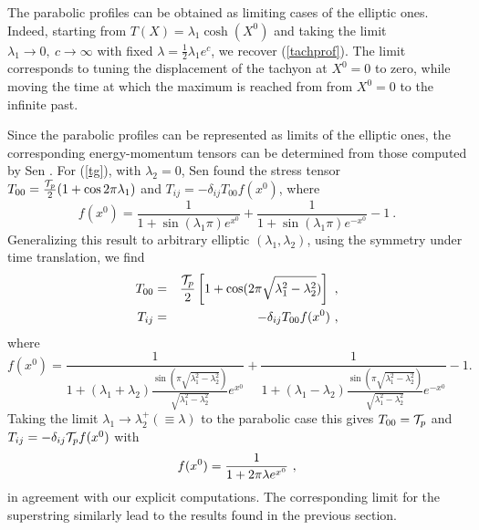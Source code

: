 \documentclass[a4paper,12pt]{article}
\begin{document}
The parabolic profiles can be obtained as limiting cases of the elliptic ones.
Indeed, starting from $T(X)= \lambda_1 \cosh (X^0)$ and taking the
limit  $\lambda_1 \rightarrow 0,~c \rightarrow \infty $ with fixed 
$\lambda = \frac{1}{2} \lambda_1 e^{c}$, we recover (\ref{tachprof}).
The limit corresponds to tuning the displacement of the tachyon at $X^0=0$ to 
zero, while moving the time at which the maximum is reached from 
from $X^0=0$ to the infinite past. 

Since the parabolic profiles can be represented as limits of the elliptic ones,
the corresponding energy-momentum tensors can be determined from those
computed by Sen \cite{Sen1}. For  (\ref{tg}), with $\lambda_2=0$, Sen found
the stress tensor 
$T_{00}={{\cal T}_p \over 2} (1+ \cos 2 \pi \lambda_1)$
and $T_{ij}=-\delta_{ij} T_{00} f(x^0)$,
where 
\begin{equation}
f(x^0)=\frac{1}{1+ \sin (\lambda_1 \pi) e^{x^0}} 
+\frac{1}{1+ \sin (\lambda_1 \pi) e^{-x^0}} -1~. 
\end{equation}
Generalizing this result to arbitrary elliptic $(\lambda_1,\lambda_2)$,
using the symmetry under time translation, we find
\begin{eqnarray}
T_{00}&=&{{\cal T}_p \over 2} \left[1+ \cos  (2 \pi \sqrt{\lambda_1^2-\lambda_2^2}) \right]~,\nonumber \\
 T_{ij}&=&-\delta_{ij} T_{00} f(x^0)~,
\end{eqnarray}
where 
\begin{equation}
f(x^0)=\frac{1}{1+ 
(\lambda_1+\lambda_2) 
\frac{\sin (\pi \sqrt{\lambda_1^2-\lambda_2^2})}
{\sqrt{\lambda_1^2-\lambda_2^2}  }  e^{x^0}} 
+\frac{1}{1+ 
(\lambda_1-\lambda_2) 
\frac{\sin (\pi \sqrt{\lambda_1^2-\lambda_2^2})}
{\sqrt{\lambda_1^2-\lambda_2^2}  }  e^{-x^0}} -1.
\label{emt1}
\end{equation}
Taking the limit $\lambda_1\to \lambda_2^+ (\equiv\lambda)$ to the parabolic case  
this gives $T_{00}= {\cal T}_p$ and $T_{ij}=-\delta_{ij}{\cal T}_pf(x^0)$ with
\begin{equation}
f(x^0)={1\over 1+2 \pi \lambda e^{x^0}}~, 
\label{tg2}
\end{equation}
in agreement with our explicit computations. The corresponding limit for
the superstring similarly lead to the results found in the previous section.
\end{document}
